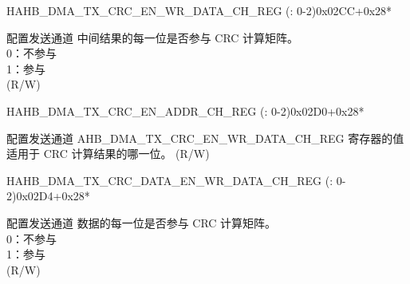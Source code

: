 \begin{register}{H}{AHB\_DMA\_TX\_CRC\_EN\_WR\_DATA\_CH\_REG (: 0-2)}{0x02CC+0x28*}\label{regdesc:AHBDMATXCRCENWRDATACHNREG}
%
\regnewline%
\begin{regdesc}\begin{reglist}
\label{fielddesc:AHBDMATXCRCENWRDATACHN}\item [AHB\_DMA\_TX\_CRC\_EN\_WR\_DATA\_CH\regindex{n}] 配置发送通道  中间结果的每一位是否参与 CRC 计算矩阵。\\
0：不参与\\
1：参与\\ (R/W)
\end{reglist}\end{regdesc}
\end{register}


\begin{register}{H}{AHB\_DMA\_TX\_CRC\_EN\_ADDR\_CH\_REG (: 0-2)}{0x02D0+0x28*}\label{regdesc:AHBDMATXCRCENADDRCHNREG}
%
\regnewline%
\begin{regdesc}\begin{reglist}
\label{fielddesc:AHBDMATXCRCENADDRCHN}\item [AHB\_DMA\_TX\_CRC\_EN\_ADDR\_CH\regindex{n}] 配置发送通道  AHB\_DMA\_TX\_CRC\_EN\_WR\_DATA\_CH\_REG 寄存器的值适用于 CRC 计算结果的哪一位。 (R/W)
\end{reglist}\end{regdesc}
\end{register}


\begin{register}{H}{AHB\_DMA\_TX\_CRC\_DATA\_EN\_WR\_DATA\_CH\_REG (: 0-2)}{0x02D4+0x28*}\label{regdesc:AHBDMATXCRCDATAENWRDATACHNREG}
%
%
\regnewline%
\begin{regdesc}\begin{reglist}
\label{fielddesc:AHBDMATXCRCDATAENWRDATACHN}\item [AHB\_DMA\_TX\_CRC\_DATA\_EN\_WR\_DATA\_CH\regindex{n}] 配置发送通道  数据的每一位是否参与 CRC 计算矩阵。\\
0：不参与\\
1：参与\\ (R/W)
\end{reglist}\end{regdesc}
\end{register}


